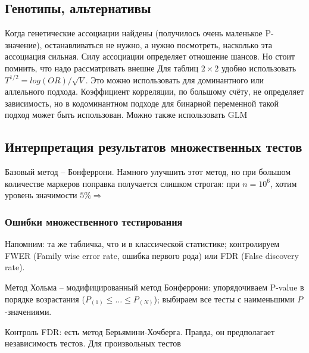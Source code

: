 \documentclass[main.tex]{sufbfiles}
\begin{document}
\subsection{ Генотипы, альтернативы }


Когда генетические ассоциации найдены (получилось очень маленькое P-значение), останавливаться не нужно, а нужно посмотреть, насколько эта ассоциация сильная.
Силу ассоциации определяет отношение шансов.
Но стоит помнить, что надо рассматривать внешне
Для таблиц $ 2 \times 2 $ удобно использовать $ T^{1/2} = log(OR)/\sqrt V $.
Это можно использовать для доминантного или аллельного подхода.
Коэффициент корреляции, по большому счёту, не определяет зависимость, но в кодоминантном подходе для бинарной переменной такой подход может быть использован.
Можно также использовать GLM

\subsection{ Интерпретация результатов множественных тестов }

Базовый метод -- Бонферрони.
Намного улучшить этот метод, но при большом количестве маркеров поправка получается слишком строгая: при $ n = 10^6 $, хотим уровень значимости $ 5\% \Rightarrow $

\subsubsection{Ошибки множественного тестирования}

Напомним: та же табличка, что и в классической статистике; контролируем FWER (Family wise error rate, ошибка первого рода) или FDR (False discovery rate).

Метод Хольма -- модифицированный метод Бонферрони: упорядочиваем P-value в порядке возрастания ($ P_{(1)} \le \dots \le P_{(N)} $); выбираем все тесты с наименьшими $ P $-значениями.

Контроль FDR: есть метод Берьямини-Хочберга.
Правда, он предполагает независимость тестов.
Для произвольных тестов 
\end{document}
